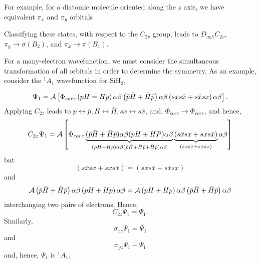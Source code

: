 For example, for a diatomic molecule oriented along the $z$ axis, we 
have equivalent $\pi_x$ and $\pi_y$ orbitals

\noindent
Classifying these states, with respect to the $C_{2v}$ group, leads to
$D_{\infty h} C_{2v}$, $\pi_y \rightarrow \sigma (B_2)$, and $\pi_x 
\rightarrow \pi (B_1)$.

For a many-electron wavefunction, we must consider the simultaneous 
transformation of all orbitals in order to determine the symmetry.  As 
an example, consider the ${^1A}_1$ wavefunction for SiH$_2$,

\begin{equation}
\Psi_1 = {\cal A} \left[ \Phi_{core} \left( pH = Hp \right) \alpha 
\beta \left( {\bar{p}} {\bar{H}} + {\bar{H}} {\bar{p}} \right) 
\alpha \beta \left( s x s {\bar{x}} + s {\bar{x}} sx \right) \alpha 
\beta \right] .
\end{equation}
Applying $C_{2z}$ leads to $p \leftrightarrow {\bar{p}}, H 
\leftrightarrow {\bar{H}}, sx \leftrightarrow s {\bar{x}}$, and, 
$\Phi_{core} \rightarrow \Phi_{core}$, and hence,
\begin{equation}
C_{2z} \Psi_1 = {\cal A} \left[ \Phi_{core} 
\underbrace{({\bar{p}}{\bar{H}}+{\bar{H}}{\bar{p}})\alpha \beta 
(pH+HP)\alpha \beta}_{(pH+Hp)\alpha 
\beta({\bar{p}}{\bar{H}}+{\bar{H}}{\bar{p}}+{\bar{H}}{\bar{p}})\alpha 
\beta} 
\underbrace{(s{\bar{x}}sx+sxs{\bar{x}})}_{(sxs{\bar{x}}+s{\bar{x}}sx)} 
\alpha \beta \right]
\end{equation}
but
\begin{equation}
\left( s {\bar{x}} sx + sxs{\bar{x}} \right) = \left( sxs{\bar{x}} + 
s {\bar{x}} sx\right)
\end{equation}
and
\begin{equation}
{\cal A} \left( {\bar{p}} {\bar{H}} + {\bar{H}} {\bar{p}} \right) 
\alpha \beta \left( pH + Hp \right) \alpha \beta = {\cal A} \left( 
pH + Hp \right) \alpha \beta \left( {\bar{p}} {\bar{H}} + {\bar{H}} 
{\bar{p}} \right) \alpha \beta
\end{equation}
interchanging two pairs of electrons.  Hence,
\begin{equation}
C_{2z} \Psi_1 = \Psi_1 .
\end{equation}
Similarly,
\begin{equation}
\sigma_{xz} \Psi_1 = \Psi_1
\end{equation}
and
\begin{equation}
\sigma_{yz} \Psi_1 - \Psi_1
\end{equation}
and, hence, $\Psi_1$ is ${^1A}_1$.

